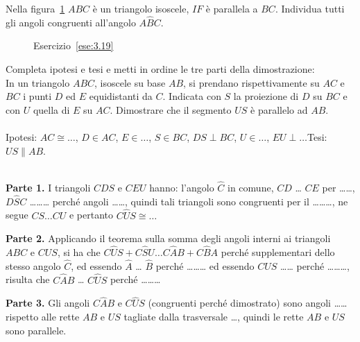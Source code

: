 \begin{esercizio}
\label{ese:3.19}
Nella figura~\ref{fig:ese3.19} $ABC$ è un triangolo isoscele, $IF$ è 
parallela a $BC$. Individua tutti gli angoli congruenti all'angolo 
$A\widehat{B}C$.
\end{esercizio}

\begin{inaccessibleblock}
 \begin{figure}[htb]
\centering
\caption{Esercizio~\ref{ese:3.19}}\label{fig:ese3.19}
\end{figure}
\end{inaccessibleblock}

\begin{esercizio}
\label{ese:3.20}
Completa ipotesi e tesi e metti in ordine le tre parti della 
dimostrazione:\\
In un triangolo $ABC$, isoscele su base $AB$, si prendano 
rispettivamente su $AC$ e $BC$ i punti $D$ ed $E$ equidistanti da 
$C$. Indicata con $S$ la proiezione di $D$ su $BC$ e con $U$ quella di 
$E$ su $AC$. Dimostrare che il segmento $US$ è parallelo ad $AB$.\\
~\\
\noindent Ipotesi: $AC\cong \ldots$, $D\in AC$, $E\in \ldots$, $S\in 
BC$, $DS\perp BC$, $U\in \ldots$, $EU\perp \ldots$\hfill Tesi: 
$US\parallel AB$.\\
~\\
\noindent\begin{minipage}{.75\textwidth}
\textbf{Parte 1.} I triangoli $CDS$ e $CEU$  hanno: l'angolo 
$\widehat{C}$ in comune, $CD$ \ldots{} $CE$ per \ldots\ldots{}, 
$D\widehat{S}C$ \ldots\ldots\ldots{} perché angoli \ldots\ldots{}, 
quindi tali triangoli sono congruenti per il \ldots\ldots\ldots{}, ne 
segue $CS \ldots CU$ e pertanto $C\widehat{U}S\cong \ldots$\par

\textbf{Parte 2.} Applicando il teorema sulla somma degli angoli 
interni ai triangoli $ABC$ e $CUS$, si ha che $C\widehat{U}S + 
C\widehat{S}U \ldots{} C\widehat{A}B + C\widehat{B}A$ perché 
supplementari dello stesso angolo $\widehat{C}$, ed essendo 
$\widehat{A}$ \dots{} $\widehat{B}$ perché \ldots\ldots\ldots{} ed 
essendo $C\widehat{U}S$ \ldots\ldots{} perché \ldots\ldots\ldots{}, 
risulta che $C\widehat{A}B$ \ldots{} $C\widehat{U}S$ perché 
\ldots\ldots\ldots{}\par

\textbf{Parte 3.} Gli angoli $C\widehat{A}B$ e $C\widehat{U}S$ 
(congruenti perché dimostrato) sono angoli \ldots\ldots rispetto alle 
rette $AB$ e $US$ tagliate dalla trasversale \ldots, quindi le rette 
$AB$ e $US$ sono parallele.
\end{minipage}\hfil
\begin{minipage}{.25\textwidth}
\centering
\end{minipage}
\end{esercizio}

